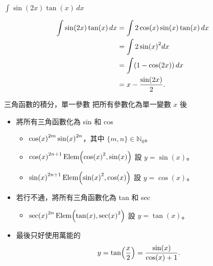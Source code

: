 \documentclass{beamer}
\newcommand{\Left} {\mathopen{}\mathclose\bgroup\left}
\newcommand{\Right}{\aftergroup\egroup\right}
\newcommand{\N}{\mathbb N}
\newcommand{\Elem}{\operatorname{Elem}}
\theoremstyle{remark}
\begin{document}
\begin{frame}{$\displaystyle \int \sin(2x) \tan(x)\,dx$}
  \begin{solution}
    \begin{align*}
      \int \sin(2x) \tan(x)\,dx &= \int 2 \cos(x) \sin(x) \tan(x)\,dx\\
	&= \int 2 \sin \Left( x \Right)^2 dx\\
	&= \int (1 - \cos(2x))\,dx\\
	&= x - \frac{\sin(2x)}{2}.
    \end{align*}
  \end{solution}
\end{frame}

\begin{frame}{三角函數的積分，單一參數}
  把所有參數化為單一變數 $x$ 後
  \begin{itemize}
    \item 將所有三角函數化為 sin 和 cos
      \begin{itemize}
	\item $\cos \Left( x \Right)^{2m} \sin \Left( x \Right)^{2n}$，其中 $\{m,n\} \in \N_0$。
	\item $\cos \Left( x \Right)^{2n+1} \Elem \Left( \cos \Left( x \Right)^2, \sin(x) \Right)$ 設 $y = \sin(x)$。
	\item $\sin \Left( x \Right)^{2n+1} \Elem \Left( \sin \Left( x \Right)^2, \cos(x) \Right)$ 設 $y = \cos(x)$。
      \end{itemize}
    \item 若行不通，將所有三角函數化為 tan 和 sec
      \begin{itemize}
	\item $\sec \Left( x \Right)^{2n} \Elem \Left( \tan(x), \sec \Left( x \Right)^2 \Right)$ 設 $y = \tan(x)$。
      \end{itemize}
    \item 最後只好使用萬能的
      \[y = \tan \Left( \frac x 2 \Right) = \frac{\sin(x)}{\cos(x) + 1}.\]
  \end{itemize}
\end{frame}
\end{document}
